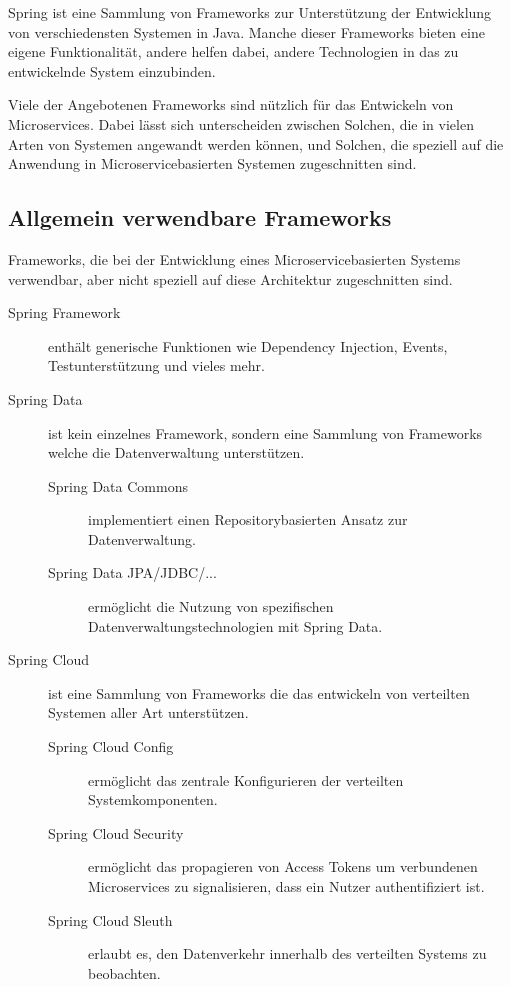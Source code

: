 \documentclass{article}
\begin{document}
Spring ist eine Sammlung von Frameworks zur Unterstützung der Entwicklung von verschiedensten Systemen in Java.
Manche dieser Frameworks bieten eine eigene Funktionalität, andere helfen dabei, andere Technologien in das zu entwickelnde System einzubinden.

Viele der Angebotenen Frameworks sind nützlich für das Entwickeln von Microservices.
Dabei lässt sich unterscheiden zwischen Solchen, die in vielen Arten von Systemen angewandt werden können, und Solchen, die speziell auf die Anwendung in Microservicebasierten Systemen zugeschnitten sind.

\subsection{Allgemein verwendbare Frameworks}

Frameworks, die bei der Entwicklung eines Microservicebasierten Systems verwendbar, aber nicht speziell auf diese Architektur zugeschnitten sind.

\begin{description}
    \item[Spring Framework] enthält generische Funktionen wie Dependency Injection, Events, Testunterstützung und vieles mehr.
    \item[Spring Data] ist kein einzelnes Framework, sondern eine Sammlung von Frameworks welche die Datenverwaltung unterstützen.
    \begin{description}
        \item[Spring Data Commons] implementiert einen Repositorybasierten Ansatz zur Datenverwaltung.
        \item[Spring Data JPA/JDBC/...] ermöglicht die Nutzung von spezifischen Datenverwaltungstechnologien mit Spring Data.
    \end{description}

    \item[Spring Cloud] ist eine Sammlung von Frameworks die das entwickeln von verteilten Systemen aller Art unterstützen.
    \begin{description}
        \item[Spring Cloud Config] ermöglicht das zentrale Konfigurieren der verteilten Systemkomponenten.
        \item[Spring Cloud Security] ermöglicht das propagieren von Access Tokens um verbundenen Microservices zu signalisieren, dass ein Nutzer authentifiziert ist.
        \item[Spring Cloud Sleuth] erlaubt es, den Datenverkehr innerhalb des verteilten Systems zu beobachten.
    \end{description}
\end{description}
\end{document}

